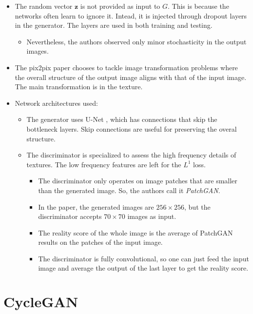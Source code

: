 \documentclass[10pt]{article}
\newcommand{\ve}[1]{\pmb{#1}}
\begin{document}
\begin{itemize}
    \item The random vector $\ve{z}$ is not provided as input to $G$. This is because the networks often learn to ignore it. Intead, it is injected through dropout layers in the generator. The layers are used in both training and testing.
    \begin{itemize}
      \item Nevertheless, the authors observed only minor stochasticity in the output images.
    \end{itemize}

    \item The pix2pix paper chooses to tackle image transformation problems where the overall structure of the output image aligns with that of the input image. The main transformation is in the texture.

    \item Network architectures used:
    \begin{itemize}
      \item The generator uses U-Net \cite{Ronneberger:2015}, which has connections that skip the bottleneck layers. Skip connections are useful for preserving the overal structure. 

      \item The discriminator is specialized to assess the high frequency details of textures. The low frequency features are left for the $L^1$ loss.
      \begin{itemize}
         \item The discriminator only operates on image patches that are smaller than the generated image. So, the authors call it \emph{PatchGAN}.

         \item In the paper, the generated images are $256 \times 256$, but the discriminator accepts $70\times70$ images as input.

         \item The reality score of the whole image is the average of PatchGAN results on the patches of the input image.

         \item The discriminator is fully convolutional, so one can just feed the input image and average the output of the last layer to get the reality score.
       \end{itemize} 
    \end{itemize}
  \end{itemize}  

  \section{CycleGAN}
\end{document}
